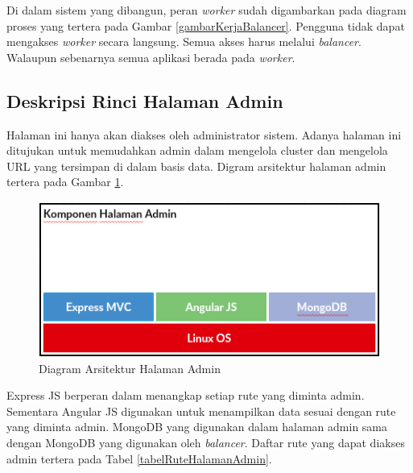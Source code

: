 \documentclass{ta-its}
\begin{document}
				Di dalam sistem yang dibangun, peran \textit{worker} sudah digambarkan pada diagram proses yang tertera pada Gambar \ref{gambarKerjaBalancer}. Pengguna tidak dapat mengakses \textit{worker} secara langsung. Semua akses harus melalui \textit{balancer}. Walaupun sebenarnya semua aplikasi berada pada \textit{worker}.
			
			\subsection{Deskripsi Rinci Halaman Admin}
				Halaman ini hanya akan diakses oleh administrator sistem. Adanya halaman ini ditujukan untuk memudahkan admin dalam mengelola cluster dan mengelola URL yang tersimpan di dalam basis data. Digram arsitektur halaman admin tertera pada Gambar \ref{gambarArsitekturWeb}.
				
				\begin{figure}[] %
					\centering
					\includegraphics[width=\linewidth]{contoh_img/kompweb}
					\caption{Diagram Arsitektur Halaman Admin}
					\label{gambarArsitekturWeb}
				\end{figure}
				
				Express JS berperan dalam menangkap setiap rute yang diminta admin. Sementara Angular JS digunakan untuk menampilkan data sesuai dengan rute yang diminta admin. MongoDB yang digunakan dalam halaman admin sama dengan MongoDB yang digunakan oleh \textit{balancer}. Daftar rute yang dapat diakses admin tertera pada Tabel \ref{tabelRuteHalamanAdmin}.
				
\end{document}
